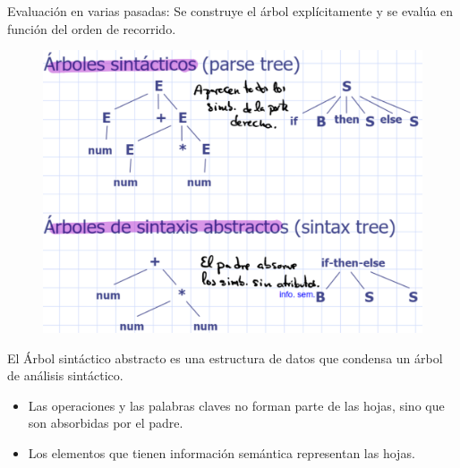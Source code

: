 \documentclass[12pt]{report} %
\begin{document}
Evaluación en varias pasadas: Se construye el árbol explícitamente y se evalúa en función del orden de recorrido.

\begin{figure}[H]
  {\includegraphics[scale=.25]{2021-05-01 01_21_28-05_resum_Sem_2021.pdf - Foxit Reader.png}}
\end{figure}

El Árbol sintáctico abstracto es una estructura de datos que condensa un árbol de análisis sintáctico. 
\begin{itemize}
  \item Las operaciones y las palabras claves no forman parte de las hojas, sino que son absorbidas por el padre. 
  \item Los elementos que tienen información semántica representan las hojas.
\end{itemize}
\end{document}
